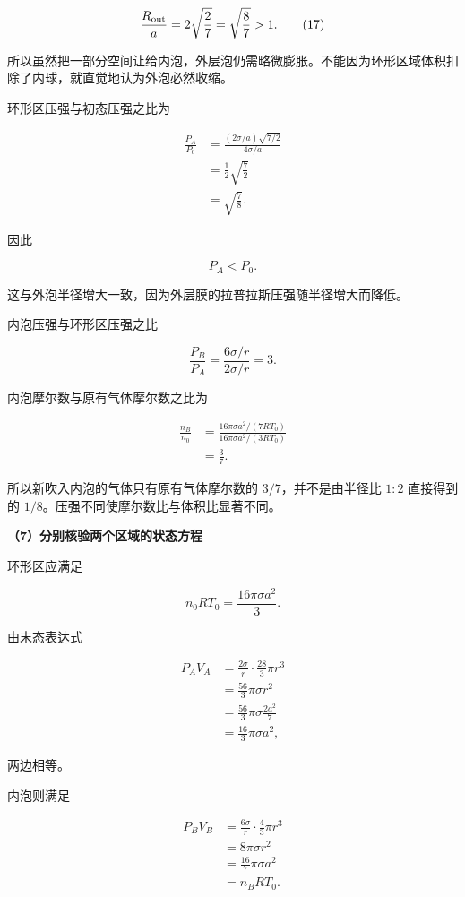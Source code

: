 \documentclass[12pt,a4paper,UTF8]{ctexart}
\begin{document}
\[
\frac{R_{\rm out}}a
=2\sqrt{\frac27}
=\sqrt{\frac87}>1.
\tag{17}
\]

所以虽然把一部分空间让给内泡，外层泡仍需略微膨胀。不能因为环形区域体积扣除了内球，就直觉地认为外泡必然收缩。

环形区压强与初态压强之比为

\[
\begin{aligned}
\frac{P_A}{P_0}
&=\frac{(2\sigma/a)\sqrt{7/2}}{4\sigma/a}\\
&=\frac12\sqrt{\frac72}\\
&=\sqrt{\frac78}.
\end{aligned}
\tag{18}
\]

因此

\[
P_A<P_0.
\]

这与外泡半径增大一致，因为外层膜的拉普拉斯压强随半径增大而降低。

内泡压强与环形区压强之比

\[
\frac{P_B}{P_A}
=\frac{6\sigma/r}{2\sigma/r}
=3.
\tag{19}
\]

内泡摩尔数与原有气体摩尔数之比为

\[
\begin{aligned}
\frac{n_B}{n_0}
&=\frac{16\pi\sigma a^2/(7RT_0)}
{16\pi\sigma a^2/(3RT_0)}\\
&=\frac37.
\end{aligned}
\tag{20}
\]

所以新吹入内泡的气体只有原有气体摩尔数的 \(3/7\)，并不是由半径比 \(1:2\)
直接得到的 \(1/8\)。压强不同使摩尔数比与体积比显著不同。

\textbf{（7）分别核验两个区域的状态方程}

环形区应满足

\[
n_0RT_0
=\frac{16\pi\sigma a^2}{3}.
\]

由末态表达式

\[
\begin{aligned}
P_AV_A
&=\frac{2\sigma}{r}\cdot\frac{28}{3}\pi r^3\\
&=\frac{56}{3}\pi\sigma r^2\\
&=\frac{56}{3}\pi\sigma\frac{2a^2}{7}\\
&=\frac{16}{3}\pi\sigma a^2,
\end{aligned}
\]

两边相等。

内泡则满足

\[
\begin{aligned}
P_BV_B
&=\frac{6\sigma}{r}\cdot\frac43\pi r^3\\
&=8\pi\sigma r^2\\
&=\frac{16}{7}\pi\sigma a^2\\
&=n_BRT_0.
\end{aligned}
\tag{21}
\]
\end{document}
